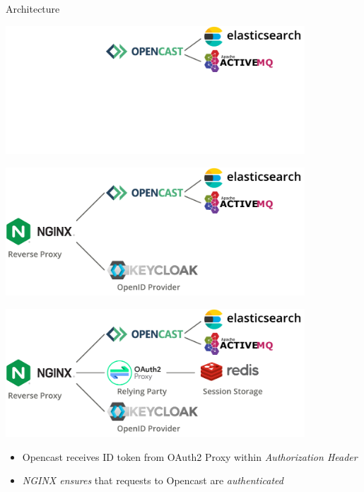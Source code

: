 \documentclass[aspectratio=169]{beamer}
\begin{document}
\begin{frame}{Architecture}
	\begin{overprint}
		\centerline{\includegraphics[width=0.84\textwidth]{figures/prototype-architecture-1}}
		\centerline{\includegraphics[width=0.84\textwidth]{figures/prototype-architecture-2}}
		\centerline{\includegraphics[width=0.84\textwidth]{figures/prototype-architecture-3}}
	\end{overprint}
	\begin{itemize}
		\item<4-> Opencast receives ID token from OAuth2 Proxy within \emph{Authorization Header}
		\item<5> \emph{NGINX ensures} that requests to Opencast are \emph{authenticated} \hfill {}
	\end{itemize}
\end{frame}
\end{document}
